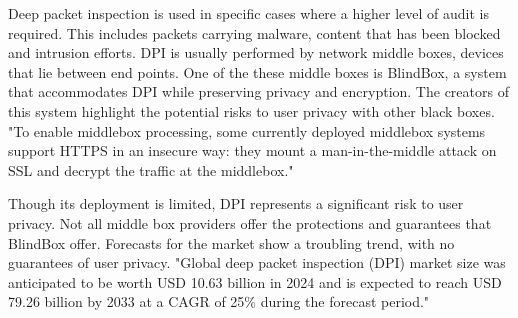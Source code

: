 Deep packet inspection is used in specific cases where a higher level of audit is required. This includes packets carrying malware, content that has been blocked and intrusion efforts. DPI is usually performed by network middle boxes, devices that lie between end points. One of the these middle boxes is BlindBox, a system that accommodates DPI while preserving privacy and encryption. The creators of this system highlight the potential risks to user privacy with other black boxes. "To enable middlebox processing, some currently deployed middlebox systems support HTTPS in
an insecure way: they mount a man-in-the-middle attack on SSL and decrypt the traffic at the middlebox." \cite{sherry2015blindbox}

Though its deployment is limited, DPI represents a significant risk to user privacy. Not all middle box providers offer the protections and guarantees that BlindBox offer. Forecasts for the market show a troubling trend, with no guarantees of user privacy. "Global deep packet inspection (DPI) market size was anticipated to be worth USD 10.63 billion in 2024 and is expected to reach USD 79.26 billion by 2033 at a CAGR of 25\% during the forecast period." \cite{DPIMarketInfo}

